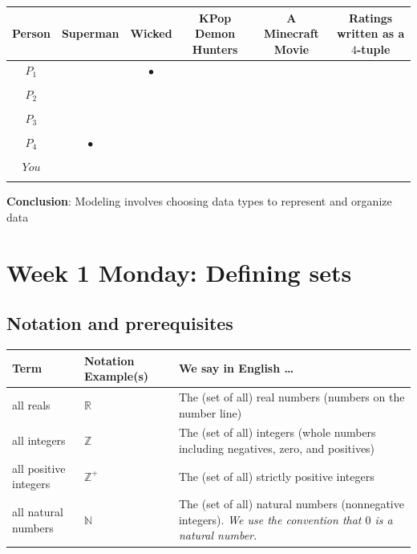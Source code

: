 \documentclass[12pt, oneside]{article}
\newcommand{\cmark}{\ding{51}}
\newcommand{\xmark}{\ding{55}}
\begin{document}
\begin{center}
\begin{tabular}{c|cccc||c}
Person & Superman & Wicked & KPop Demon Hunters & A Minecraft Movie & Ratings written as a $4$-tuple\\
\hline
$P_1$     & \xmark & $\bullet$ & \cmark & \phantom{$(-1, 0, 1, 1)$} \\
&&&& \\
$P_2$     & \cmark & \cmark & \xmark & \phantom{$(1, 1, -1, 1)$} \\
&&&& \\
$P_3$     & \cmark & \cmark & \cmark & \phantom{$(1, 1, 1, 1)$} \\
&&&& \\
$P_4$     & $\bullet$ & \xmark & \cmark &  \\
&&&& \\
$You$     &  &  &  &  \\
&&&& \\
\end{tabular}
\end{center} \vfill
{\bf Conclusion}: Modeling involves choosing data types to represent and organize data

\newpage
\section*{Week 1 Monday: Defining sets}
\subsection*{Notation and prerequisites}


\begin{center}
\begin{tabular}{|llp{9.8cm}|}
\hline
{\bf Term} & {\bf Notation Example(s)} & {\bf We say in English \ldots } \\
\hline
all reals & $\mathbb{R}$ & The (set of all) real numbers (numbers on the number line)\\
all integers & $\mathbb{Z}$ & The (set of all) integers (whole numbers including negatives, zero, and positives) \\
all positive integers & $\mathbb{Z}^+$ & The (set of all) strictly positive integers \\
all natural numbers & $\mathbb{N}$ & The (set of all) natural numbers (nonnegative integers). {\it We use the convention that $0$ is a natural number.} \\


\hline
\end{tabular}
\end{center} 
\end{document}
